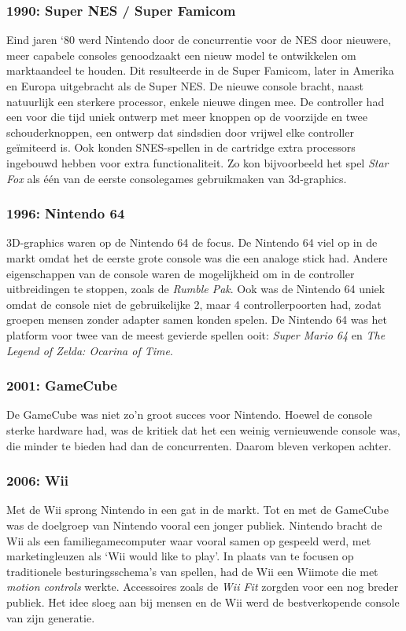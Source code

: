 \documentclass{article}
\begin{document}
\subsubsection{1990: Super NES / Super Famicom}
Eind jaren `80 werd Nintendo door de concurrentie voor de NES door nieuwere, meer capabele consoles genoodzaakt een nieuw model te ontwikkelen om marktaandeel te houden. Dit resulteerde in de Super Famicom, later in Amerika en Europa uitgebracht als de Super NES. 
De nieuwe console bracht, naast natuurlijk een sterkere processor, enkele nieuwe dingen mee. De controller had een voor die tijd uniek ontwerp met meer knoppen op de voorzijde en twee schouderknoppen, een ontwerp dat sindsdien door vrijwel elke controller geïmiteerd is.
Ook konden SNES-spellen in de cartridge extra processors ingebouwd hebben voor extra functionaliteit. Zo kon bijvoorbeeld het spel \textit{Star Fox} als \'e\'en van de eerste consolegames gebruikmaken van 3d-graphics.


\subsubsection{1996: Nintendo 64}
3D-graphics waren op de Nintendo 64 de focus. De Nintendo 64 viel op in de markt omdat het de eerste grote console was die een analoge stick had. Andere eigenschappen van de console waren de mogelijkheid om in de controller uitbreidingen te stoppen, zoals de \textit{Rumble Pak}. Ook was de Nintendo 64 uniek omdat de console niet de gebruikelijke 2, maar 4 controllerpoorten had, zodat groepen mensen zonder adapter samen konden spelen. De Nintendo 64 was het platform voor twee van de meest gevierde spellen ooit: \textit{Super Mario 64} en \textit{The Legend of Zelda: Ocarina of Time}. 

\subsubsection{2001: GameCube}
De GameCube was niet zo'n groot succes voor Nintendo. Hoewel de console sterke hardware had, was de kritiek dat het een weinig vernieuwende console was, die minder te bieden had dan de concurrenten. Daarom bleven verkopen achter. 


\subsubsection{2006: Wii}
Met de Wii sprong Nintendo in een gat in de markt. Tot en met de GameCube was de doelgroep van Nintendo vooral een jonger publiek. Nintendo bracht de Wii als een familiegamecomputer waar vooral samen op gespeeld werd, met marketingleuzen als `Wii would like to play'. In plaats van te focusen op traditionele besturingsschema's van spellen, had de Wii een Wiimote die met \textit{motion controls} werkte. Accessoires zoals de \textit{Wii Fit} zorgden voor een nog breder publiek. Het idee sloeg aan bij mensen en de Wii werd de bestverkopende console van zijn generatie.
\end{document}
